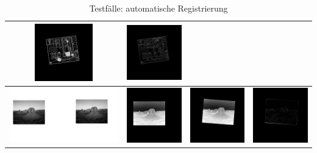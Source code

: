 \documentclass[12pt,german]{article}
\begin{document}
\begin{table}[H]
\begin{tabular}{| c | c | c | c |}
    \includegraphics[width=2.5cm]{images/autoregister/binary2SH.jpg} &
    \includegraphics[width=2.5cm]{images/autoregister/binary2DIFF.jpg} \\
    \hline
    \includegraphics[width=5cm]{images/autoregister/gray2.jpg} &
    \includegraphics[width=2.5cm]{images/autoregister/gray1FH.jpg} &
    \includegraphics[width=2.5cm]{images/autoregister/gray1SH.jpg} &
    \includegraphics[width=2.5cm]{images/autoregister/gray1DIFF.jpg} \\
    \hline
    
  \end{tabular}
  \caption{Testfälle: automatische Registrierung}
  \label{tab:autoRegisterTest}
\end{table}


\end{document}

